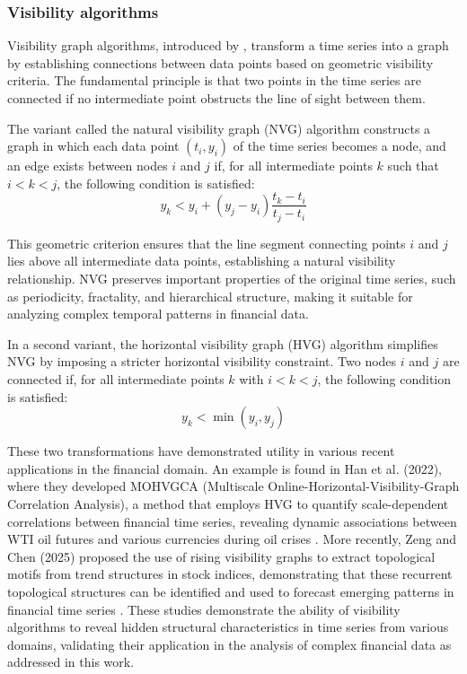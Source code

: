 \documentclass[11pt,a4paper]{article}
\begin{document}
\subsubsection{Visibility algorithms}

Visibility graph algorithms, introduced by \citep{lacasa2008visibility}, transform a time series into a graph by establishing connections between data points based on geometric visibility criteria. The fundamental principle is that two points in the time series are connected if no intermediate point obstructs the line of sight between them.

The variant called the natural visibility graph (NVG) algorithm constructs a graph in which each data point $(t_i, y_i)$ of the time series becomes a node, and an edge exists between nodes $i$ and $j$ if, for all intermediate points $k$ such that $i < k < j$, the following condition is satisfied:
\begin{equation}
y_k < y_i + (y_j - y_i) \frac{t_k - t_i}{t_j - t_i}
\end{equation}

This geometric criterion ensures that the line segment connecting points $i$ and $j$ lies above all intermediate data points, establishing a natural visibility relationship. NVG preserves important properties of the original time series, such as periodicity, fractality, and hierarchical structure, making it suitable for analyzing complex temporal patterns in financial data.

In a second variant, the horizontal visibility graph (HVG) algorithm \citep{luque2009horizontal} simplifies NVG by imposing a stricter horizontal visibility constraint. Two nodes $i$ and $j$ are connected if, for all intermediate points $k$ with $i < k < j$, the following condition is satisfied:
\begin{equation}
y_k < \min(y_i, y_j)
\end{equation}

These two transformations have demonstrated utility in various recent applications in the financial domain. An example is found in Han et al. (2022), where they developed MOHVGCA (Multiscale Online-Horizontal-Visibility-Graph Correlation Analysis), a method that employs HVG to quantify scale-dependent correlations between financial time series, revealing dynamic associations between WTI oil futures and various currencies during oil crises \citep{han2022multiscale}. More recently, Zeng and Chen (2025) proposed the use of rising visibility graphs to extract topological motifs from trend structures in stock indices, demonstrating that these recurrent topological structures can be identified and used to forecast emerging patterns in financial time series \citep{chen2025identifying}. These studies demonstrate the ability of visibility algorithms to reveal hidden structural characteristics in time series from various domains, validating their application in the analysis of complex financial data as addressed in this work.
\end{document}
